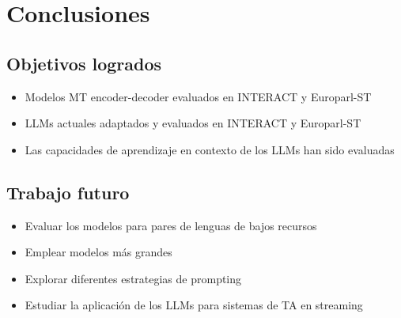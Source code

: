 \documentclass[landscape,spanish]{article}
\begin{document}
\cp %
\section{Conclusiones}

\subsection*{Objetivos logrados}
\vspace{5mm}

\begin{itemize}\itemsep=10mm
    \item Modelos MT encoder-decoder evaluados en INTERACT y Europarl-ST

    \item LLMs actuales adaptados y evaluados en INTERACT y Europarl-ST

    \item Las capacidades de aprendizaje en contexto de los LLMs han sido evaluadas
\end{itemize}


\subsection*{Trabajo futuro}
\vspace{5mm}

\begin{itemize}\itemsep=6mm
    \item Evaluar los modelos para pares de lenguas de bajos recursos

    \item Emplear modelos más grandes

    \item Explorar diferentes estrategias de prompting

    \item Estudiar la aplicación de los LLMs para sistemas de TA en streaming
\end{itemize}
\end{document}
